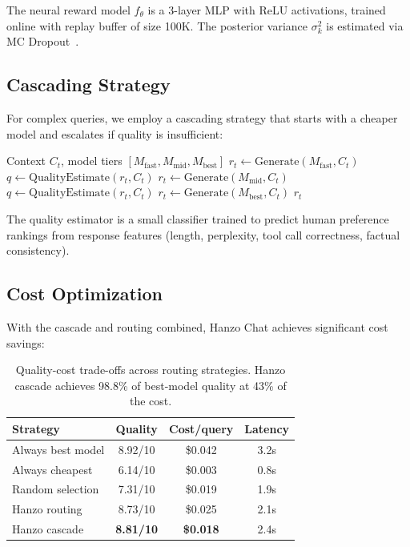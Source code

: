 \documentclass[11pt,twocolumn]{article}
\begin{document}
The neural reward model $f_\theta$ is a 3-layer MLP with ReLU activations, trained online with replay buffer of size 100K. The posterior variance $\sigma_k^2$ is estimated via MC Dropout~\cite{gal2016dropout}.

\subsection{Cascading Strategy}

For complex queries, we employ a cascading strategy that starts with a cheaper model and escalates if quality is insufficient:

\begin{algorithm}[H]
\caption{Model Cascade}
\label{alg:cascade}
\begin{algorithmic}[1]
\Require Context $C_t$, model tiers $[M_{\text{fast}}, M_{\text{mid}}, M_{\text{best}}]$
\State $r_t \gets \text{Generate}(M_{\text{fast}}, C_t)$
\State $q \gets \text{QualityEstimate}(r_t, C_t)$
    \State $r_t \gets \text{Generate}(M_{\text{mid}}, C_t)$
    \State $q \gets \text{QualityEstimate}(r_t, C_t)$
        \State $r_t \gets \text{Generate}(M_{\text{best}}, C_t)$
    \EndIf
\EndIf
\State \Return $r_t$
\end{algorithmic}
\end{algorithm}

The quality estimator is a small classifier trained to predict human preference rankings from response features (length, perplexity, tool call correctness, factual consistency).

\subsection{Cost Optimization}

With the cascade and routing combined, Hanzo Chat achieves significant cost savings:

\begin{table}[H]
\centering
\small
\begin{tabular}{lccc}
\toprule
\textbf{Strategy} & \textbf{Quality} & \textbf{Cost/query} & \textbf{Latency} \\
\midrule
Always best model & 8.92/10 & \$0.042 & 3.2s \\
Always cheapest & 6.14/10 & \$0.003 & 0.8s \\
Random selection & 7.31/10 & \$0.019 & 1.9s \\
Hanzo routing & 8.73/10 & \$0.025 & 2.1s \\
Hanzo cascade & \textbf{8.81/10} & \textbf{\$0.018} & 2.4s \\
\bottomrule
\end{tabular}
\caption{Quality-cost trade-offs across routing strategies. Hanzo cascade achieves 98.8\% of best-model quality at 43\% of the cost.}
\label{tab:routing_cost}
\end{table}
\end{document}
